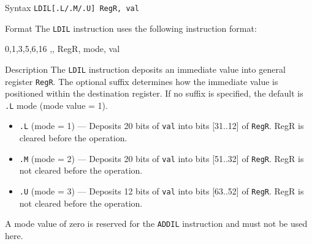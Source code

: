 %
%
\pagebreak
{}

\begin{iPageDescEntry}{Syntax}
\texttt{LDIL[.L/.M/.U] RegR, val}
\end{iPageDescEntry}

\begin{iPageDescEntry}{Format}
The \texttt{LDIL} instruction uses the following instruction format: \\

\begin{flushleft}
\drawInstrFormat
    {0,1,3,5,6,16}
    {\OpCodeGrpALU,\OpCodeLDIL, RegR, mode, val}
\end{flushleft}
\end{iPageDescEntry}

\begin{iPageDescEntry}{Description}
The \texttt{LDIL} instruction deposits an immediate value into general register \texttt{RegR}.  
The optional suffix determines how the immediate value is positioned within the destination register. If no suffix is specified, the default is \texttt{.L} mode (mode value = 1).

\begin{itemize}
    \setlength{\itemsep}{0.5em}
    \setlength{\parskip}{0pt}
    \item \texttt{.L} (mode = 1) — Deposits 20 bits of \texttt{val} into bits [31..12] of \texttt{RegR}. RegR is cleared before the operation. 
    \item \texttt{.M} (mode = 2) — Deposits 20 bits of \texttt{val} into bits [51..32] of \texttt{RegR}. RegR is not cleared before the operation.
    \item \texttt{.U} (mode = 3) — Deposits 12 bits of \texttt{val} into bits [63..52] of \texttt{RegR}. RegR is not cleared before the operation.
\end{itemize}

A mode value of zero is reserved for the \texttt{ADDIL} instruction and must not be used here.
\end{iPageDescEntry}

